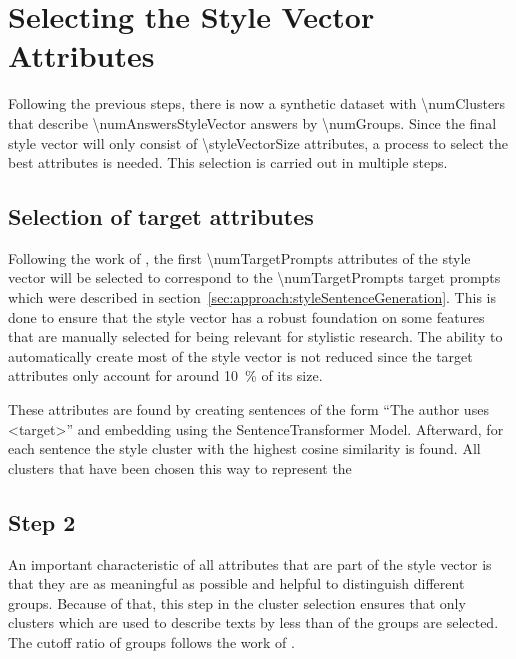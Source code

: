 \section{Selecting the Style Vector Attributes}
\label{sec:approach:selection}

Following the previous steps, there is now a synthetic dataset with \num{\numClusters} that describe \num{\numAnswersStyleVector} answers by \num{\numGroups}. Since the final style vector will only consist of \num{\styleVectorSize} attributes, a process to select the best attributes is needed. This selection is carried out in multiple steps.

\subsection{Selection of target attributes}
\label{sec:approach:selection:targetAttributes}
Following the work of \citet{patelLearningInterpretableStyle2023}, the first \num{\numTargetPrompts} attributes of the style vector will be selected to correspond to the \num{\numTargetPrompts} target prompts which were described in section~\ref{sec:approach:styleSentenceGeneration}.
This is done to ensure that the style vector has a robust foundation on some features that are manually selected for being relevant for stylistic research. The ability to automatically create most of the style vector is not reduced since the target attributes only account for around \SI{10}{\percent} of its size.

These attributes are found by creating sentences of the form \enquote{The author uses <target>} and embedding using the SentenceTransformer Model. %
Afterward, for each sentence the style cluster with the highest cosine similarity is found.
All clusters that have been chosen this way to represent the


\subsection{Step 2}
An important characteristic of all attributes that are part of the style vector is that they are as meaningful as possible and helpful to distinguish different groups. Because of that, this step in the cluster selection ensures that only clusters which are used to describe texts by less than \clusterMaxGroupRatio{} of the groups are selected. The cutoff ratio of groups follows the work of \citet{patelLearningInterpretableStyle2023}.

